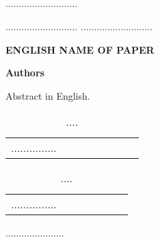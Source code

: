 \documentclass[
aps,%
12pt,%
final,%
notitlepage,%
oneside,%
onecolumn,%
nobibnotes,%
nofootinbib,%
superscriptaddress,%
noshowpacs,%
centertags
]%
{revtex4}
\begin{document}
\subsection{}
...........................
\newpage
\begin{thebibliography}{99}
...........................
...........................
\end{thebibliography}
%
\newpage
%
%
\begin{center}
\large \bfseries \MakeTextUppercase{%
English name of paper
}
\end{center}
%
\begin{center}
\bfseries
Authors
\end{center}
%
\begin{center}
\begin{minipage}{\textwidth - 2cm}
\small
Abstract in English.
\end{minipage}
\end{center}
%
\newpage
%
%
\newpage
%
%
\newpage
%
\begin{table}
\caption{....}
\bigskip
\begin{tabular}{|c|c|c|c|c|c|c|c|}
...............
\end{tabular}
\end{table}
%
\newpage
\begin{table}
\caption{....}
\bigskip
\begin{tabular}{|c|c|c|c|c|c|c|}
...............
\end{tabular}
\end{table}
%
......................
%
\end{document}
